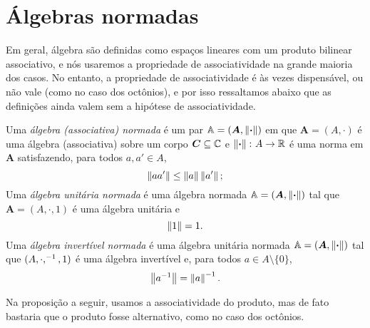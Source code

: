 \section{Álgebras normadas}

Em geral, álgebra são definidas como espaços lineares com um produto bilinear associativo, e nós usaremos a propriedade de associatividade na grande maioria dos casos. No entanto, a propriedade de associatividade é às vezes dispensável, ou não vale (como no caso dos octônios), e por isso ressaltamos abaixo que as definições ainda valem sem a hipótese de associatividade.

\begin{definition}
Uma \emph{álgebra (associativa) normada} é um par $\mathbb A = (\bm A,\left\Vert{\bm{\cdot}}\right\Vert)$ em que $\bm A = (A,\cdot)$ é uma álgebra (associativa) sobre um corpo $\bm C \subseteq \mathbb{C}$ e $\left\Vert{\bm{\cdot}}\right\Vert\colon A \to \mathbb{R}$ é uma norma em $\bm A$ satisfazendo, para todos $a,a' \in A$,
	\begin{equation*}
	\left\Vert{aa'}\right\Vert \leq \left\Vert{a}\right\Vert\left\Vert{a'}\right\Vert;
	\end{equation*}
Uma \emph{álgebra unitária normada} é uma álgebra normada $\mathbb A = (\bm A,\left\Vert{\bm{\cdot}}\right\Vert)$ tal que $\bm A = (A,\cdot,1)$ é uma álgebra unitária e
	\begin{equation*}
	\left\Vert{1}\right\Vert = 1.
	\end{equation*}
Uma \emph{álgebra invertível normada} é uma álgebra unitária normada $\mathbb A = (\bm A,\left\Vert{\bm{\cdot}}\right\Vert)$ tal que $(A,\cdot,^{-1},1)$ é uma álgebra invertível e, para todos $a \in A \setminus \{0\}$,
	\begin{equation*}
	\left\Vert{a^{-1}}\right\Vert = \left\Vert{a}\right\Vert^{-1}.
	\end{equation*}
\end{definition}

Na proposição a seguir, usamos a associatividade do produto, mas de fato bastaria que o produto fosse alternativo, como no caso dos octônios.

